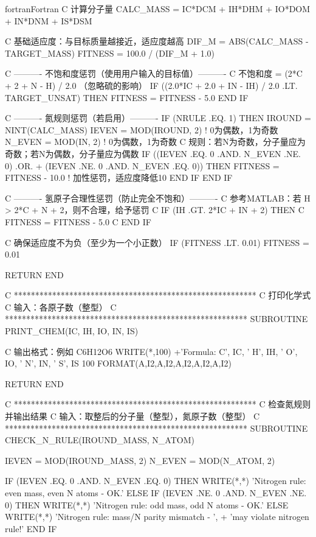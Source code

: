 \begin{envcode}{fortran}{Fortran}
C     计算分子量
      CALC_MASS = IC*DCM + IH*DHM + IO*DOM + IN*DNM + IS*DSM
      
C     基础适应度：与目标质量越接近，适应度越高
      DIF_M = ABS(CALC_MASS - TARGET_MASS)
      FITNESS = 100.0 / (DIF_M + 1.0)
      
C     ---------- 不饱和度惩罚（使用用户输入的目标值）----------
C     不饱和度 = (2*C + 2 + N - H) / 2.0 （忽略硫的影响）
      IF ((2.0*IC + 2.0 + IN - IH) / 2.0 .LT. TARGET_UNSAT) THEN
          FITNESS = FITNESS - 5.0
      END IF
      
C     ---------- 氮规则惩罚（若启用）----------
      IF (NRULE .EQ. 1) THEN
          IROUND = NINT(CALC_MASS)
          IEVEN = MOD(IROUND, 2)      ! 0为偶数，1为奇数
          N_EVEN = MOD(IN, 2)         ! 0为偶数，1为奇数
C         规则：若N为奇数，分子量应为奇数；若N为偶数，分子量应为偶数
          IF ((IEVEN .EQ. 0 .AND. N_EVEN .NE. 0) .OR.
     +        (IEVEN .NE. 0 .AND. N_EVEN .EQ. 0)) THEN
              FITNESS = FITNESS - 10.0  ! 加性惩罚，适应度降低10
          END IF
      END IF
      
C     ---------- 氢原子合理性惩罚（防止完全不饱和）----------
C     参考MATLAB：若 H > 2*C + N + 2，则不合理，给予惩罚
C     IF (IH .GT. 2*IC + IN + 2) THEN
C         FITNESS = FITNESS - 5.0
C     END IF
      
C     确保适应度不为负（至少为一个小正数）
      IF (FITNESS .LT. 0.01) FITNESS = 0.01
      
      RETURN
      END
      
C     *********************************************************
C     打印化学式
C     输入：各原子数（整型）
C     *********************************************************
      SUBROUTINE PRINT_CHEM(IC, IH, IO, IN, IS)
      
C     输出格式：例如 C6H12O6
      WRITE(*,100)
     +'Formula: C', IC, '  H', IH, '  O', IO, '  N', IN, '  S', IS
100   FORMAT(A,I2,A,I2,A,I2,A,I2,A,I2)
      
      RETURN
      END
      
C     *********************************************************
C     检查氮规则并输出结果
C     输入：取整后的分子量（整型），氮原子数（整型）
C     *********************************************************
      SUBROUTINE CHECK_N_RULE(IROUND_MASS, N_ATOM)
      
      IEVEN = MOD(IROUND_MASS, 2)
      N_EVEN = MOD(N_ATOM, 2)
      
      IF (IEVEN .EQ. 0 .AND. N_EVEN .EQ. 0) THEN
          WRITE(*,*) 'Nitrogen rule: even mass, even N atoms - OK.'
      ELSE IF (IEVEN .NE. 0 .AND. N_EVEN .NE. 0) THEN
          WRITE(*,*) 'Nitrogen rule: odd mass, odd N atoms - OK.'
      ELSE
          WRITE(*,*) 'Nitrogen rule: mass/N parity mismatch - ',
     +               'may violate nitrogen rule!'
      END IF
      

\end{envcode}

